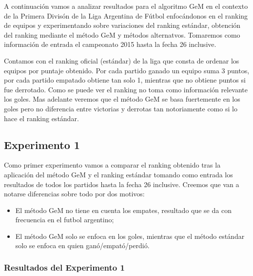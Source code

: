 \par A continuaci\'on vamos a analizar resultados para el algoritmo GeM en el contexto de la Primera Divis\'on de la Liga Argentina de F\'utbol enfoc\'andonos en el ranking de equipos y experimentando sobre variaciones del ranking est\'andar, obtenci\'on del ranking mediante el m\'etodo GeM y m\'etodos alternatvos. Tomaremos como informaci\'on de entrada el campeonato 2015 hasta la fecha 26 inclusive. 
\bigskip

\par Contamos con el ranking oficial (est\'andar) de la liga que consta de ordenar los equipos por puntaje obtenido. Por cada partido ganado un equipo suma 3 puntos, por cada partido empatado obtiene tan solo 1, mientras que no obtiene puntos si fue derrotado. Como se puede ver el ranking no toma como informaci\'on relevante los goles. Mas adelante veremos que el m\'etodo GeM se basa fuertemente en los goles pero no diferencia entre victorias y derrotas tan notoriamente como si lo hace el ranking est\'andar.

\subsection{Experimento 1}
\par Como primer experimento vamos a comparar el ranking obtenido tras la aplicaci\'on del m\'etodo GeM y el ranking est\'andar tomando como entrada los resultados de todos los partidos hasta la fecha 26 inclusive. Creemos que van a notarse diferencias sobre todo por dos motivos:
\begin{itemize}
	\item El m\'etodo GeM no tiene en cuenta los empates, resultado que se da con frecuencia en el futbol argentino;
	\item El m\'etodo GeM solo se enfoca en los goles, mientras que el m\'etodo est\'andar solo se enfoca en quien gan\'o/empat\'o/perdi\'o.
\end{itemize}

\newpage

\subsubsection{Resultados del Experimento 1}

